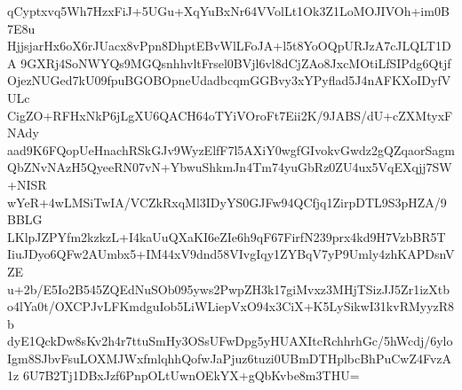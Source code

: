 qCyptxvq5Wh7HzxFiJ+5UGu+XqYuBxNr64VVolLt1Ok3Z1LoMOJIVOh+im0B7E8u
HjjsjarHx6oX6rJUacx8vPpn8DhptEBvWlLFoJA+l5t8YoOQpURJzA7cJLQLT1DA
9GXRj4SoNWYQs9MGQsnhhvltFrsel0BVjl6vl8dCjZAo8JxcMOtiLfSIPdg6Qtjf
OjezNUGed7kU09fpuBGOBOpneUdadbcqmGGBvy3xYPyflad5J4nAFKXoIDyfVULc
CigZO+RFHxNkP6jLgXU6QACH64oTYiVOroFt7Eii2K/9JABS/dU+cZXMtyxFNAdy
aad9K6FQopUeHnachRSkGJv9WyzElfF7l5AXiY0wgfGIvokvGwdz2gQZqaorSagm
QbZNvNAzH5QyeeRN07vN+YbwuShkmJn4Tm74yuGbRz0ZU4ux5VqEXqjj7SW+NISR
wYeR+4wLMSiTwIA/VCZkRxqMl3IDyYS0GJFw94QCfjq1ZirpDTL9S3pHZA/9BBLG
LKlpJZPYfm2kzkzL+I4kaUuQXaKI6eZIe6h9qF67FirfN239prx4kd9H7VzbBR5T
IiuJDyo6QFw2AUmbx5+IM44xV9dnd58VIvgIqy1ZYBqV7yP9Umly4zhKAPDsnVZE
u+2b/E5Io2B545ZQEdNuSOb095yws2PwpZH3k17giMvxz3MHjTSizJJ5Zr1izXtb
o4lYa0t/OXCPJvLFKmdguIob5LiWLiepVxO94x3CiX+K5LySikwI31kvRMyyzR8b
dyE1QckDw8sKv2h4r7ttuSmHy3OSsUFwDpg5yHUAXItcRchhrhGc/5hWcdj/6ylo
Igm8SJbvFsuLOXMJWxfmlqhhQofwJaPjuz6tuzi0UBmDTHplbcBhPuCwZ4FvzA1z
6U7B2Tj1DBxJzf6PnpOLtUwnOEkYX+gQbKvbe8m3THU=
